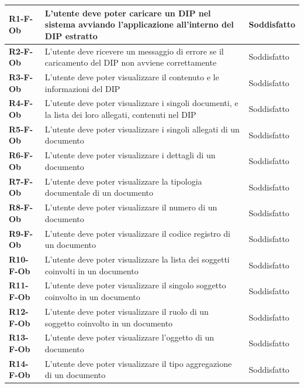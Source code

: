 \documentclass[a4paper,12pt]{article}
\begin{document}
{{{\begin{longtable}{|>{\centering\arraybackslash}m{}|>{\centering\arraybackslash}m{}|>{\centering\arraybackslash}m{}|}
                \textbf{R1-F-Ob} & L'utente deve poter caricare un DIP nel sistema avviando l'applicazione all'interno del DIP estratto & 
                Soddisfatto \\
                \hline
                \textbf{R2-F-Ob} & L'utente deve ricevere un messaggio di errore se il caricamento del DIP non avviene correttamente & 
                Soddisfatto \\
                \hline
                \textbf{R3-F-Ob} & L'utente deve poter visualizzare il contenuto e le informazioni del DIP & Soddisfatto \\ 
                \hline
                \textbf{R4-F-Ob} & L'utente deve poter visualizzare i singoli documenti, e la lista dei loro allegati, contenuti nel DIP & 
                Soddisfatto \\ 
                \hline
                \textbf{R5-F-Ob} & L'utente deve poter visualizzare i singoli allegati di un documento & Soddisfatto \\ 
                \hline
                \textbf{R6-F-Ob} & L'utente deve poter visualizzare i dettagli di un documento & Soddisfatto \\ 
                \hline
                \textbf{R7-F-Ob} & L'utente deve poter visualizzare la tipologia documentale di un documento & Soddisfatto \\
                \hline
                \textbf{R8-F-Ob} & L'utente deve poter visualizzare il numero di un documento & Soddisfatto \\
                \hline
                \textbf{R9-F-Ob} & L'utente deve poter visualizzare il codice registro di un documento & Soddisfatto \\
                \hline
                \textbf{R10-F-Ob} & L'utente deve poter visualizzare la lista dei soggetti coinvolti in un documento & Soddisfatto \\ 
                \hline
                \textbf{R11-F-Ob} & L'utente deve poter visualizzare il singolo soggetto coinvolto in un documento & 
                Soddisfatto \\ 
                \hline
                \textbf{R12-F-Ob} & L'utente deve poter visualizzare il ruolo di un soggetto coinvolto in un documento & Soddisfatto \\ 
                \hline
                \textbf{R13-F-Ob} & L'utente deve poter visualizzare l'oggetto di un documento & Soddisfatto \\ 
                \hline
                \textbf{R14-F-Ob} & L'utente deve poter visualizzare il tipo aggregazione di un documento & Soddisfatto \\ 

\end{longtable}}}}
\end{document}
